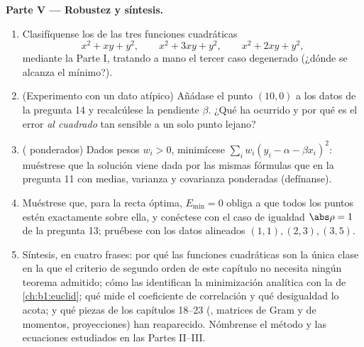 \begin{problem}
\medskip
\noindent\textbf{Parte V --- Robustez y síntesis.}
\begin{enumerate}[resume]
  \item Clasifíquense los  de las tres funciones
        cuadráticas
        \[
        x^2 + xy + y^2, \qquad x^2 + 3xy + y^2, \qquad
        x^2 + 2xy + y^2 ,
        \]
        mediante la Parte I, tratando a mano el tercer caso degenerado
        (¿dónde se alcanza el mínimo?).
  \item (Experimento con un dato atípico) Añádase el punto $(10, 0)$ a los
        datos de la pregunta 14 y recalcúlese la pendiente $\beta$.
        ¿Qué ha ocurrido y por qué es el error \emph{al cuadrado} tan
        sensible a un solo punto lejano?
  \item ( ponderados) Dados pesos $w_i > 0$,
        minimícese $\sum_i w_i(y_i - \alpha - \beta x_i)^2$: muéstrese
        que la solución viene dada por las mismas fórmulas que en la
        pregunta 11 con medias, varianza y covarianza ponderadas
        (defínanse).
  \item Muéstrese que, para la recta óptima, $E_{\min} = 0$ obliga
        a que todos los puntos estén exactamente sobre ella, y conéctese con el
        caso de igualdad $\abs\rho = 1$ de la pregunta 13; pruébese con los
        datos alineados $(1,1), (2,3), (3,5)$.
  \item Síntesis, en cuatro frases: por qué las funciones cuadráticas
        son la única clase en la que el criterio de segundo orden de
        este capítulo no necesita ningún teorema admitido; cómo las 
        identifican la minimización analítica con la  de \cref{ch:b1:euclid}; qué mide el coeficiente de
        correlación y qué desigualdad lo acota;
        y qué piezas de los capítulos 18--23 (, matrices de Gram y
        de momentos, proyecciones) han reaparecido. Nómbrense el
        método y las ecuaciones estudiados en las Partes II--III.
\end{enumerate}
\end{problem}
